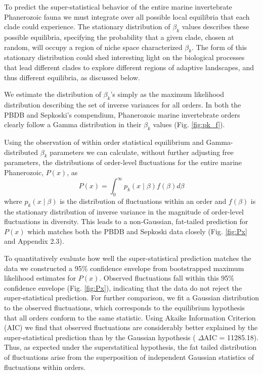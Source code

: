 \documentclass[12pt]{article}
\begin{document}
To predict the super-statistical behavior of the entire marine
invertebrate Phanerozoic fauna we must integrate over all possible
local equilibria that each clade could experience. The stationary
distribution of $\beta_k$ values describes these possible equilibria,
specifying the probability that a given clade, chosen at random, will
occupy a region of niche space characterized $\beta_k$. The form of
this stationary distribution could shed interesting light on the
biological processes that lead different clades to explore different
regions of adaptive landscapes, and thus different equilibria, as
discussed below.

We estimate the distribution of $\beta_k$'s simply as the maximum
likelihood distribution describing the set of inverse variances for
all orders. In both the PBDB and Sepkoski's compendium, Phanerozoic
marine invertebrate orders clearly follow a Gamma distribution in
their $\beta_k$ values (Fig. \ref{fig:pk_f}).  

Using the observation of within order statistical equilibrium and
Gamma-distributed $\beta_k$ parameters we can calculate, without
further adjusting free parameters, the distributions of order-level
fluctuations for the entire marine Phanerozoic, $P(x)$, as
\begin{equation}
  P(x) = \int_0^\infty p_k(x \mid \beta) f(\beta) d\beta \label{eq:PxInt}
\end{equation}
where $p_k(x \mid \beta)$ is the distribution of fluctuations within
an order and $f(\beta)$ is the stationary distribution of inverse
variance in the magnitude of order-level fluctuations in
diversity. This leads to a non-Gaussian, fat-tailed prediction for
$P(x)$ which matches both the PBDB and Sepkoski data closely
(Fig. \ref{fig:Px} and Appendix 2.3).

To quantitatively evaluate how well the super-statistical prediction
matches the data we constructed a 95\% confidence envelope from
bootstrapped maximum likelihood estimates for $P(x)$. Observed
fluctuations fall within this 95\% confidence envelope
(Fig. \ref{fig:Px}), indicating that the data do not reject the
super-statistical prediction. For further comparison, we fit a
Gaussian distribution to the observed fluctuations, which corresponds
to the equilibrium hypothesis that all orders conform to the same
statistic. Using Akaike Information Criterion (AIC) we find that
observed fluctuations are considerably better explained by the
super-statistical prediction than by the Gaussian hypothesis ({\small
  $\Delta$}AIC = 11285.18). Thus, as expected under the
superstatitical hypothesis, the fat tailed distribution of
fluctuations arise from the superposition of independent Gaussian
statistics of fluctuations within orders.
\end{document}
